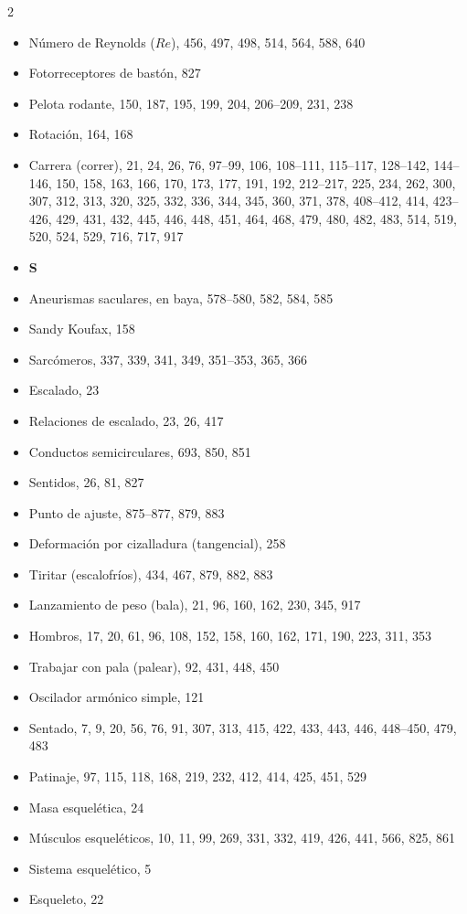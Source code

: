\documentclass[12pt,a4paper]{book}
\begin{document}
\begin{multicols}{2}
\begin{itemize}[leftmargin=*]
  \item Número de Reynolds ($Re$), 456, 497, 498, 514, 564, 588, 640
  \item Fotorreceptores de bastón, 827
  \item Pelota rodante, 150, 187, 195, 199, 204, 206--209, 231, 238
  \item Rotación, 164, 168
  \item Carrera (correr), 21, 24, 26, 76, 97--99, 106, 108--111, 115--117, 128--142, 144--146, 150, 158, 163, 166, 170, 173, 177, 191, 192, 212--217, 225, 234, 262, 300, 307, 312, 313, 320, 325, 332, 336, 344, 345, 360, 371, 378, 408--412, 414, 423--426, 429, 431, 432, 445, 446, 448, 451, 464, 468, 479, 480, 482, 483, 514, 519, 520, 524, 529, 716, 717, 917
  \item \textbf{S}
  \item Aneurismas saculares, en baya, 578--580, 582, 584, 585
  \item Sandy Koufax, 158
  \item Sarcómeros, 337, 339, 341, 349, 351--353, 365, 366
  \item Escalado, 23
  \item Relaciones de escalado, 23, 26, 417
  \item Conductos semicirculares, 693, 850, 851
  \item Sentidos, 26, 81, 827
  \item Punto de ajuste, 875--877, 879, 883
  \item Deformación por cizalladura (tangencial), 258
  \item Tiritar (escalofríos), 434, 467, 879, 882, 883
  \item Lanzamiento de peso (bala), 21, 96, 160, 162, 230, 345, 917
  \item Hombros, 17, 20, 61, 96, 108, 152, 158, 160, 162, 171, 190, 223, 311, 353
  \item Trabajar con pala (palear), 92, 431, 448, 450
  \item Oscilador armónico simple, 121
  \item Sentado, 7, 9, 20, 56, 76, 91, 307, 313, 415, 422, 433, 443, 446, 448--450, 479, 483
  \item Patinaje, 97, 115, 118, 168, 219, 232, 412, 414, 425, 451, 529
  \item Masa esquelética, 24
  \item Músculos esqueléticos, 10, 11, 99, 269, 331, 332, 419, 426, 441, 566, 825, 861
  \item Sistema esquelético, 5
  \item Esqueleto, 22

\end{itemize}
\end{multicols}
\end{document}
